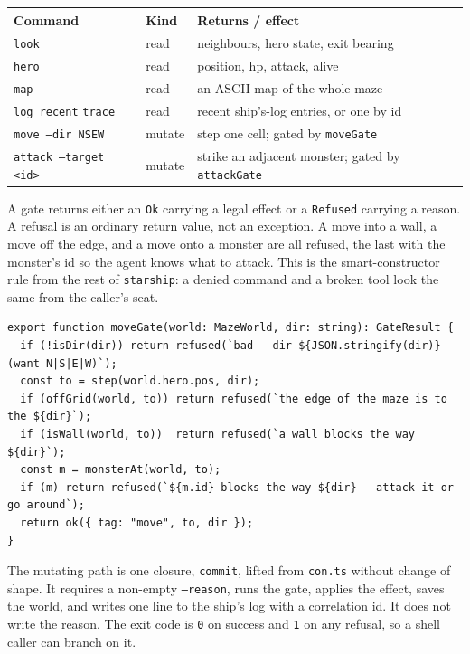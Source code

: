 \documentclass[11pt]{article}
\newcommand{\code}[1]{\texttt{#1}}
\begin{document}
\begin{center}
\begin{tabularx}{\linewidth}{@{}l l X@{}}
\toprule
\textbf{Command} & \textbf{Kind} & \textbf{Returns / effect} \\
\midrule
\code{look} & read & neighbours, hero state, exit bearing \\
\code{hero} & read & position, hp, attack, alive \\
\code{map} & read & an ASCII map of the whole maze \\
\code{log recent} \textbar{} \code{trace} & read & recent ship's-log entries, or one by id \\
\code{move --dir N\textbar S\textbar E\textbar W} & mutate & step one cell; gated by \code{moveGate} \\
\code{attack --target <id>} & mutate & strike an adjacent monster; gated by \code{attackGate} \\
\bottomrule
\end{tabularx}
\end{center}

A gate returns either an \code{Ok} carrying a legal effect or a \code{Refused}
carrying a reason. A refusal is an ordinary return value, not an exception. A
move into a wall, a move off the edge, and a move onto a monster are all refused,
the last with the monster's id so the agent knows what to attack. This is the
smart-constructor rule from the rest of \code{starship}: a denied command and a
broken tool look the same from the caller's seat.

\begin{lstlisting}[language=TS]
export function moveGate(world: MazeWorld, dir: string): GateResult {
  if (!isDir(dir)) return refused(`bad --dir ${JSON.stringify(dir)} (want N|S|E|W)`);
  const to = step(world.hero.pos, dir);
  if (offGrid(world, to)) return refused(`the edge of the maze is to the ${dir}`);
  if (isWall(world, to))  return refused(`a wall blocks the way ${dir}`);
  const m = monsterAt(world, to);
  if (m) return refused(`${m.id} blocks the way ${dir} - attack it or go around`);
  return ok({ tag: "move", to, dir });
}
\end{lstlisting}

The mutating path is one closure, \code{commit}, lifted from \code{con.ts}
without change of shape. It requires a non-empty \code{--reason}, runs the gate,
applies the effect, saves the world, and writes one line to the ship's log with a
correlation id. It does not write the reason. The exit code is \code{0} on
success and \code{1} on any refusal, so a shell caller can branch on it.
\end{document}
